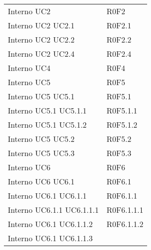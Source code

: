 \begin{longtable}{p{2.5cm}!{\VRule[1pt]}p{2.5cm}}
Interno \newline UC2
 & R0F2 \\
Interno \newline UC2
 \newline UC2.1
 & R0F2.1 \\
Interno \newline UC2
 \newline UC2.2
 & R0F2.2 \\
Interno \newline UC2
 \newline UC2.4
 & R0F2.4 \\
Interno \newline UC4
 & R0F4 \\
Interno \newline UC5
 & R0F5 \\
Interno \newline UC5
 \newline UC5.1
 & R0F5.1 \\
Interno \newline UC5.1
 \newline UC5.1.1
 & R0F5.1.1 \\
Interno \newline UC5.1
 \newline UC5.1.2
 & R0F5.1.2 \\
Interno \newline UC5
 \newline UC5.2
 & R0F5.2 \\
Interno \newline UC5
 \newline UC5.3
 & R0F5.3 \\
Interno \newline UC6
 & R0F6 \\
Interno \newline UC6
 \newline UC6.1
 & R0F6.1 \\
Interno \newline UC6.1
 \newline UC6.1.1
 & R0F6.1.1 \\
Interno \newline UC6.1.1
 \newline UC6.1.1.1
 & R0F6.1.1.1 \\
Interno \newline UC6.1
 \newline UC6.1.1.2
 & R0F6.1.1.2 \\
Interno \newline UC6.1
 \newline UC6.1.1.3

\end{longtable}
